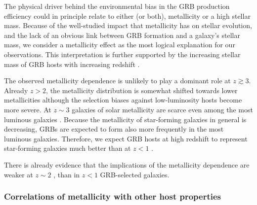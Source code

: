 \documentclass[traditabstract, longauth]{aa}
\begin{document}
{The physical driver behind the environmental bias in the GRB production efficiency could in principle relate to either (or both), metallicity or a high stellar mass. Because of the well-studied impact that metallicity has on stellar evolution, and the lack of an obvious link between GRB formation and a galaxy's stellar mass, we consider a metallicity effect as the most logical explanation for our observations. This interpretation is further supported by the increasing stellar mass of GRB hosts with increasing redshift \citep{2015arXiv150402479P}.}

The observed metallicity dependence is unlikely to play a dominant role at $z\gtrsim3$. Already $z > 2$, the metallicity distribution is somewhat shifted towards lower metallicities although the selection biases against low-luminosity hosts become more severe. At $z\sim3$ galaxies of solar metallicity are scarce even among the most luminous galaxies \citep{2014A&A...563A..58T}. Because the metallicity of star-forming galaxies in general is decreasing, GRBs are expected to form also more frequently in the most luminous galaxies. Therefore, we expect GRB hosts at high redshift to represent star-forming galaxies much better than at $z<1$ \citep[see also][]{2015arXiv150305323G, 2015arXiv150402479P}.

There is already evidence that the implications of the metallicity dependence are weaker at $z\sim2$ \citep{2013ApJ...778..128P, 2015arXiv150304246S}, than in $z<1$ GRB-selected galaxies.

\subsubsection{Correlations of metallicity with other host properties}
\label{sec:corrzz}
\end{document}
